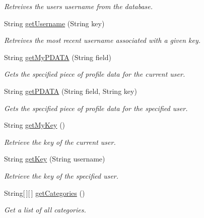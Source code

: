 \begin{DoxyCompactItemize}
\begin{DoxyCompactList}\small\item\em Retreives the users username from the database. \end{DoxyCompactList}\item 
String \hyperlink{classballmerpeak_1_1turtlenet_1_1server_1_1TurtlenetImpl_a89342b1ea50df43e072c154fdd389d1c}{get\-Username} (String key)
\begin{DoxyCompactList}\small\item\em Retreives the most recent username associated with a given key. \end{DoxyCompactList}\item 
String \hyperlink{classballmerpeak_1_1turtlenet_1_1server_1_1TurtlenetImpl_acc52a5b5a58896bf97348ccd506acb5c}{get\-My\-P\-D\-A\-T\-A} (String field)
\begin{DoxyCompactList}\small\item\em Gets the specified piece of profile data for the current user. \end{DoxyCompactList}\item 
String \hyperlink{classballmerpeak_1_1turtlenet_1_1server_1_1TurtlenetImpl_a2488f315ab0410704181e88c19e74b8c}{get\-P\-D\-A\-T\-A} (String field, String key)
\begin{DoxyCompactList}\small\item\em Gets the specified piece of profile data for the specified user. \end{DoxyCompactList}\item 
String \hyperlink{classballmerpeak_1_1turtlenet_1_1server_1_1TurtlenetImpl_a9c718d4f71c51932d61f308049f1f99d}{get\-My\-Key} ()
\begin{DoxyCompactList}\small\item\em Retrieve the key of the current user. \end{DoxyCompactList}\item 
String \hyperlink{classballmerpeak_1_1turtlenet_1_1server_1_1TurtlenetImpl_a780b106db510694aaa9156d47c09ab05}{get\-Key} (String username)
\begin{DoxyCompactList}\small\item\em Retrieve the key of the specified user. \end{DoxyCompactList}\item 
String\mbox{[}$\,$\mbox{]}\mbox{[}$\,$\mbox{]} \hyperlink{classballmerpeak_1_1turtlenet_1_1server_1_1TurtlenetImpl_aa1c659a0e4d6d60761b3f324cbe7bd8c}{get\-Categories} ()
\begin{DoxyCompactList}\small\item\em Get a list of all categories. \end{DoxyCompactList}\item 

\end{DoxyCompactItemize}
